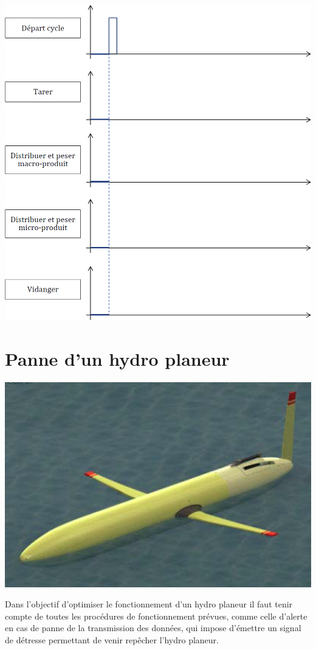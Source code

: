 \documentclass[10pt]{article}
\begin{document}
\begin{center}
\includegraphics[width=.95\textwidth]{images/fig_04}
\end{center}

\section*{Panne d'un hydro planeur}
\setcounter{subparagraph}{0}

\begin{center}
\includegraphics[width=.5\textwidth]{images/fig_05}
\end{center}
Dans l'objectif d'optimiser le fonctionnement d'un hydro planeur il faut tenir compte de toutes
les procédures de fonctionnement prévues, comme celle d'alerte en cas de panne de la
transmission des données, qui impose d'émettre un signal de détresse permettant de venir
repêcher l'hydro planeur.
\end{document}
